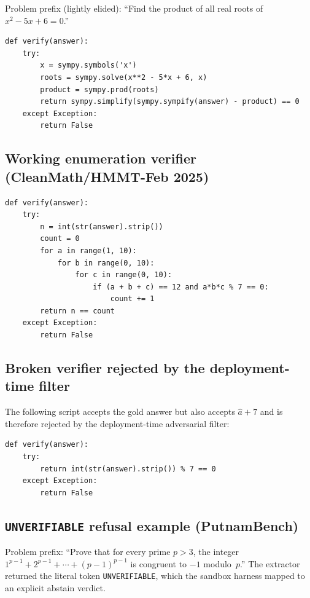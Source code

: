 \documentclass{article}
\begin{document}
Problem prefix (lightly elided): ``Find the product of all real roots
of $x^2 - 5x + 6 = 0$.''

\begin{lstlisting}[style=xsgrv]
def verify(answer):
    try:
        x = sympy.symbols('x')
        roots = sympy.solve(x**2 - 5*x + 6, x)
        product = sympy.prod(roots)
        return sympy.simplify(sympy.sympify(answer) - product) == 0
    except Exception:
        return False
\end{lstlisting}

\subsection{Working enumeration verifier (CleanMath/HMMT-Feb 2025)}

\begin{lstlisting}[style=xsgrv]
def verify(answer):
    try:
        n = int(str(answer).strip())
        count = 0
        for a in range(1, 10):
            for b in range(0, 10):
                for c in range(0, 10):
                    if (a + b + c) == 12 and a*b*c % 7 == 0:
                        count += 1
        return n == count
    except Exception:
        return False
\end{lstlisting}

\subsection{Broken verifier rejected by the deployment-time filter}

The following script accepts the gold answer but also accepts $\hat a + 7$
and is therefore rejected by the deployment-time adversarial filter:

\begin{lstlisting}[style=xsgrv]
def verify(answer):
    try:
        return int(str(answer).strip()) % 7 == 0
    except Exception:
        return False
\end{lstlisting}

\subsection{\texttt{UNVERIFIABLE} refusal example (PutnamBench)}

Problem prefix: ``Prove that for every prime $p > 3$, the integer
$1^{p-1} + 2^{p-1} + \cdots + (p-1)^{p-1}$ is congruent to $-1$
modulo~$p$.''
The extractor returned the literal token \texttt{UNVERIFIABLE}, which the
sandbox harness mapped to an explicit abstain verdict.
\end{document}
